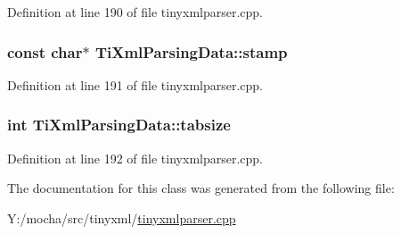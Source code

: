 Definition at line 190 of file tinyxmlparser.cpp.

\hypertarget{class_ti_xml_parsing_data_a0e3c2ea5a8b738d733735ca0318fe4ff}{
\subsubsection[{stamp}]{\setlength{\rightskip}{0pt plus 5cm}const char$\ast$ {\bf TiXmlParsingData::stamp}}}
\label{class_ti_xml_parsing_data_a0e3c2ea5a8b738d733735ca0318fe4ff}


Definition at line 191 of file tinyxmlparser.cpp.

\hypertarget{class_ti_xml_parsing_data_ab9d6aea2833e38aaef440e49c22a05ca}{
\subsubsection[{tabsize}]{\setlength{\rightskip}{0pt plus 5cm}int {\bf TiXmlParsingData::tabsize}}}
\label{class_ti_xml_parsing_data_ab9d6aea2833e38aaef440e49c22a05ca}


Definition at line 192 of file tinyxmlparser.cpp.



The documentation for this class was generated from the following file:\begin{DoxyCompactItemize}
\item 
Y:/mocha/src/tinyxml/\hyperlink{tinyxmlparser_8cpp}{tinyxmlparser.cpp}\end{DoxyCompactItemize}
